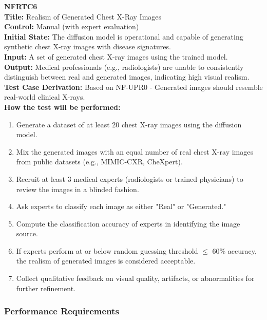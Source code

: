\documentclass[12pt, titlepage]{article}
\begin{document}
\textbf{NFRTC6}\\
\textbf{Title:} Realism of Generated Chest X-Ray Images\\
\textbf{Control:} Manual (with expert evaluation)\\
\textbf{Initial State:} The diffusion model is operational and capable of generating synthetic chest X-ray images with disease signatures.\\
\textbf{Input:} A set of generated chest X-ray images using the trained model.\\
\textbf{Output:} Medical professionals (e.g., radiologists) are unable to consistently distinguish between real and generated images, indicating high visual realism.\\
\textbf{Test Case Derivation:} Based on NF-UPR0 - Generated images should resemble real-world clinical X-rays.\\
\textbf{How the test will be performed:}
\begin{enumerate}
  \item Generate a dataset of at least 20 chest X-ray images using the diffusion model.
  \item Mix the generated images with an equal number of real chest X-ray images from public datasets (e.g., MIMIC-CXR, CheXpert).
  \item Recruit at least 3 medical experts (radiologists or trained physicians) to review the images in a blinded fashion.
  \item Ask experts to classify each image as either "Real" or "Generated."
  \item Compute the classification accuracy of experts in identifying the image source.
  \item If experts perform at or below random guessing threshold $\leq$ 60\% accuracy, the realism of generated images is considered acceptable.
  \item Collect qualitative feedback on visual quality, artifacts, or abnormalities for further refinement.
\end{enumerate}

\vspace{1em}


\subsubsection{Performance Requirements}
\end{document}
